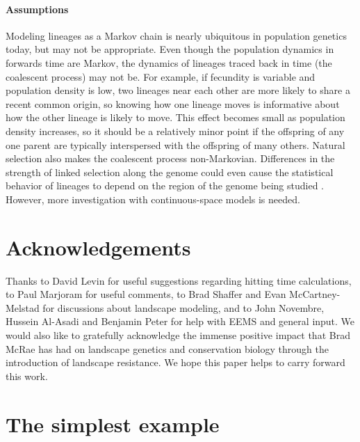 \documentclass{article}
\begin{document}
\paragraph{Assumptions}
Modeling lineages as a Markov chain is nearly ubiquitous in population genetics today,
but may not be appropriate.
Even though the population dynamics in forwards time are Markov, 
the dynamics of lineages traced back in time (the coalescent process) may not be. 
For example, if fecundity is variable and population density is low, 
two lineages near each other are more likely to share a recent common origin, 
so knowing how one lineage moves is informative about how the other lineage is likely to move. 
This effect becomes small as population density increases, 
so it should be a relatively minor point if the offspring
of any one parent are typically interspersed with the offspring of many others. 
Natural selection also makes the coalescent process non-Markovian.
Differences in the strength of linked selection along the genome
could even cause the statistical behavior of lineages to depend
on the region of the genome being studied \citep{wang2014isolation,li2016local}.
However, more investigation with continuous-space models is needed.



\section*{Acknowledgements}

Thanks to David Levin for useful suggestions regarding hitting time calculations,
to Paul Marjoram for useful comments,
to Brad Shaffer and Evan McCartney-Melstad for discussions about landscape modeling,
and to John Novembre, Hussein Al-Asadi and Benjamin Peter for help with EEMS
and general input.
We would also like to gratefully acknowledge the immense positive impact that Brad McRae \citep[1966--2017;][]{lawler2018tribute}
has had on landscape genetics and conservation biology through the introduction of landscape resistance.
We hope this paper helps to carry forward this work.




\appendix
\renewcommand{\thefigure}{S\arabic{figure}}
\setcounter{figure}{0}


\section{The simplest example}
\label{ss:simple_example}
\end{document}
